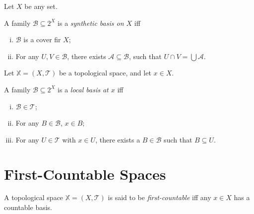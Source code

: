 \begin{definition}
	\label{def: synthetic basis}
	Let $X$ be any set.
	
	A family $\mathcal B \subseteq 2^X$ is a \textit{synthetic basis on $X$} iff
	\begin{enumerate}[(i)]
		\item $\mathcal B$ is a cover fir $X$;
		\item For any $U, V \in \mathcal B$, there exists $\mathcal A \subseteq \mathcal B$, such that $U \cap V = \bigcup \mathcal A$.
	\end{enumerate}
\end{definition}


\begin{definition}
	\label{def: local basis}
	Let $\mathbb X = (X, \mathcal T)$ be a topological space, and let $x \in X$.
	
	A family $\mathcal B \subseteq 2^X$ is a \textit{local basis at $x$} iff
	\begin{enumerate}[(i)]
		\item $\mathcal B \in \mathcal T$;
		\item For any $B \in \mathcal B$, $x \in B$;
		\item For any $U \in \mathcal T$ with $x \in U$, there exists a $B \in \mathcal B$ such that $B \subseteq U$.
	\end{enumerate}
\end{definition}


\section{First-Countable Spaces}


\begin{definition}
	\label{def: first-countable}
	A topological space $\mathbb X = (X, \mathcal T)$ is said to be \textit{first-countable} iff any $x \in X$ has a countable basis.
\end{definition}



